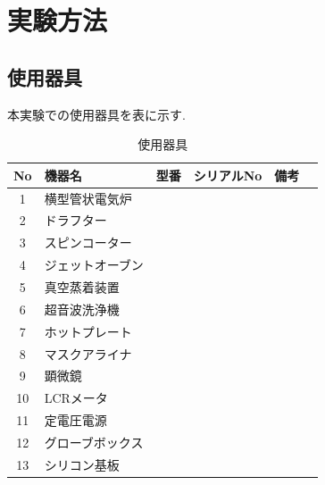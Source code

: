 \documentclass[11pt]{jarticle}
\begin{document}
\section{実験方法}
	\subsection{使用器具}
		本実験での使用器具を表に示す.
		\begin{table}[H]
		\begin{center}
		\caption{使用器具}
		\label{tab:used}
		\begin{tabular}{clllll} \toprule
		No&\multicolumn{1}{l}{機器名}&\multicolumn{1}{l}{型番}&\multicolumn{1}{l}{シリアルNo}&\multicolumn{1}{l}{備考}\\ \hline
		1&横型管状電気炉&&&\\
		2&ドラフター&&&\\
		3&スピンコーター&&&\\
		4&ジェットオーブン&&&\\
		5&真空蒸着装置&&&\\
		6&超音波洗浄機&&&\\
		7&ホットプレート&&&\\
		8&マスクアライナ&&&\\
		9&顕微鏡&&&\\
		10&LCRメータ&&&\\
		11&定電圧電源&&&\\
		12&グローブボックス&&&\\
		13&シリコン基板&&&\\ \bottomrule
		\end{tabular}
		\end{center}
		\end{table}
\end{document}
